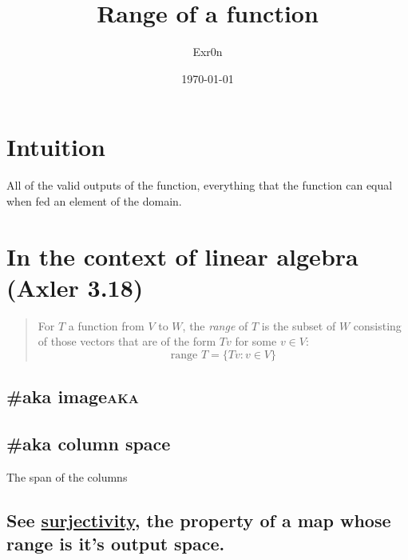 \documentclass[letterpaper]{article}
\author{Exr0n}
\date{\today}
\title{Range of a function}
\renewcommand\maketitle{}
\begin{document}
\maketitle
\section{Intuition}
\label{sec:org525cbe2}
All of the valid outputs of the function, everything that the function can equal when fed an element of the domain.
\section{In the context of linear algebra (Axler 3.18)}
\label{sec:org3abe2c6}
\begin{quote}
For \(T\) a function from \(V\) to \(W\), the \emph{range} of \(T\) is the subset of \(W\) consisting of those vectors that are of the form \(Tv\) for some \(v \in V\):
$$\text{range }T = \{Tv : v \in V\}$$
\end{quote}
\subsection{\#aka image\hfill{}\textsc{aka}}
\label{sec:orge1be174}
\subsection{\#aka column space}
\label{sec:org29c60cd}
The span of the columns
\subsection{See \href{KBrefSurjectiveFunction.org}{surjectivity}, the property of a map whose range is it's output space.}
\label{sec:org91916c8}
\end{document}
